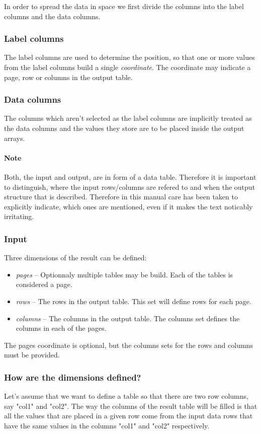 \documentclass{report}
\begin{document}
In order to spread the data in space we first divide the columns into the
label columns and the data columns.

\subsubsection{Label columns}
The label columns are used to determine the position, so that one or more values
from the label columns build a single \textit{coordinate}. The coordinate may
indicate a page, row or columns in the output table.

\subsubsection{Data columns}
The columns which aren't selected as the label columns are implicitly treated as
the data columns and the values they store are to be placed inside the output
arrays.

\paragraph{Note}
Both, the input and output, are in form of a data table. Therefore it is important
to distinguish, where the input rows/columns are refered to and when the output
structure that is described. Therefore in this manual care has been taken 
to explicitly indicate, which ones are mentioned, even if it makes the text
noticably irritating.

\subsubsection{Input}
Three dimensions of the result can be defined:

\begin{itemize}
	\item \textit{pages} -- Optionnaly multiple tables may be build. Each
		of the tables is considered a page.
	\item \textit{rows} -- The rows in the output table. This set will define
		rows for each page.
	\item \textit{columns} -- The columns in the output table. The columns
		set defines the columns in each of the pages.
\end{itemize}

The pages coordinate is optional, but the columns sets for the rows and columns
must be provided.

\subsubsection{How are the dimensions defined?}
Let's assume that we want to define a table so that there are two row columns,
say "col1" and "col2". The way the columns of the result table will be filled
is that all the values that are placed in a given row come from the input data
rows that have the same values in the columns "col1" and "col2" respectively.
\end{document}
